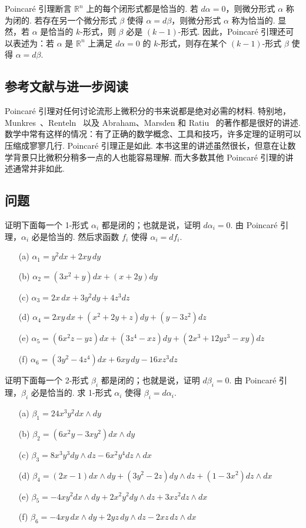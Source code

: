 Poincaré 引理断言 $\mathbb{R}^n$ 上的每个闭形式都是恰当的. 若 $d\alpha=0$，则微分形式 $\alpha$ 称为闭的. 若存在另一个微分形式 $\beta$ 使得 $\alpha=d\beta$，则微分形式 $\alpha$ 称为恰当的. 显然，若 $\alpha$ 是恰当的 $k$-形式，则 $\beta$ 必是 $(k-1)$-形式. 因此，Poincaré 引理还可以表述为：若 $\alpha$ 是 $\mathbb{R}^n$ 上满足 $d\alpha=0$ 的 $k$-形式，则存在某个 $(k-1)$-形式 $\beta$ 使得 $\alpha=d\beta$.

\subsection{参考文献与进一步阅读}

Poincaré 引理对任何讨论流形上微积分的书来说都是绝对必需的材料. 特别地，Munkres~\cite{ref35}、Renteln~\cite{ref37} 以及 Abraham、Marsden 和 Ratiu~\cite{ref01} 的著作都是很好的讲述. 数学中常有这样的情况：有了正确的数学概念、工具和技巧，许多定理的证明可以压缩成寥寥几行. Poincaré 引理正是如此. 本书这里的讲述虽然很长，但意在让数学背景只比微积分稍多一点的人也能容易理解. 而大多数其他 Poincaré 引理的讲述通常并非如此.

\subsection{问题}

\begin{question}\label{q:8-11}
证明下面每一个 1-形式 $\alpha_i$ 都是闭的；也就是说，证明 $d\alpha_i=0$. 由 Poincaré 引理，$\alpha_i$ 必是恰当的. 然后求函数 $f_i$ 使得 $\alpha_i=df_i$.
\begin{enumerate}
  \item[(a)] $\alpha_1=y^2dx+2xy\,dy$
  \item[(b)] $\alpha_2=(3x^2+y)dx+(x+2y)dy$
  \item[(c)] $\alpha_3=2x\,dx+3y^2dy+4z^3dz$
  \item[(d)] $\alpha_4=2xy\,dx+(x^2+2y+z)dy+(y-3z^2)dz$
  \item[(e)] $\alpha_5=(6x^2z-yz)dx+(3z^4-xz)dy+(2x^3+12yz^3-xy)dz$
  \item[(f)] $\alpha_6=(3y^2-4z^4)dx+6xy\,dy-16xz^3dz$
\end{enumerate}
\end{question}

\begin{question}\label{q:8-12}
证明下面每一个 2-形式 $\beta_i$ 都是闭的；也就是说，证明 $d\beta_i=0$. 由 Poincaré 引理，$\beta_i$ 必是恰当的. 求 1-形式 $\alpha_i$ 使得 $\beta_i=d\alpha_i$.
\begin{enumerate}
  \item[(a)] $\beta_1=24x^3y^2dx\wedge dy$
  \item[(b)] $\beta_2=(6x^2y-3xy^2)dx\wedge dy$
  \item[(c)] $\beta_3=8x^3y^3dy\wedge dz-6x^2y^4dz\wedge dx$
  \item[(d)] $\beta_4=(2x-1)dx\wedge dy+(3y^2-2z)dy\wedge dz+(1-3x^2)dz\wedge dx$
  \item[(e)] $\beta_5=-4xy^2dx\wedge dy+2x^2y^2dy\wedge dz+3xz^2dz\wedge dx$
  \item[(f)] $\beta_6=-4xy\,dx\wedge dy+2yz\,dy\wedge dz-2xz\,dz\wedge dx$
\end{enumerate}
\end{question}

